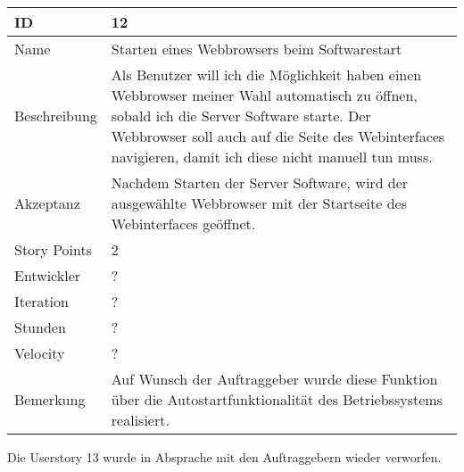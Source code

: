 \begin{table}[htbp]
    \begin{minipage}{\linewidth}
        \setlength{\tymax}{0.5\linewidth}
        \centering
        \small
        \begin{tabulary}{\textwidth}{|l|p{10cm}|} \hline
            ID   &12\\\hline
            Name  &Starten eines Webbrowsers beim Softwarestart\\\hline
            Beschreibung&Als Benutzer will ich die Möglichkeit haben einen Webbrowser meiner Wahl automatisch zu öffnen, sobald ich die Server Software starte. Der Webbrowser soll auch auf die Seite des Webinterfaces navigieren, damit ich diese nicht manuell tun muss.\\\hline
            Akzeptanz &Nachdem Starten der Server Software, wird der ausgewählte Webbrowser mit der Startseite des Webinterfaces geöffnet.\\\hline
            Story Points&2\\\hline
            Entwickler &?\\\hline
            Iteration &?\\\hline
            Stunden  &?\\\hline
            Velocity &?\\\hline
            Bemerkung & Auf Wunsch der Auftraggeber wurde diese Funktion über die Autostartfunktionalität des Betriebssystems realisiert.
            \\\hline
        \end{tabulary}
    \end{minipage}
\end{table}

Die Userstory 13 wurde in Absprache mit den Auftraggebern wieder verworfen.

